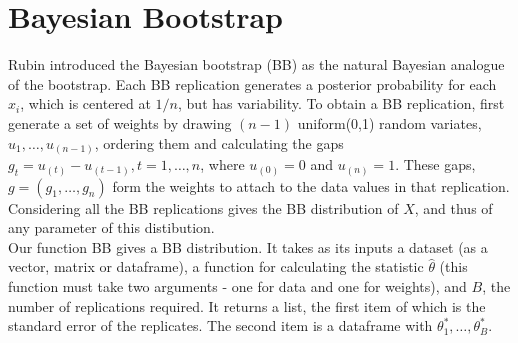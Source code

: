 \documentclass{article}\usepackage[]{graphicx}\usepackage[]{color}
\begin{document}
\section{Bayesian Bootstrap}
Rubin introduced the Bayesian bootstrap (BB) as the natural Bayesian analogue of the bootstrap. Each BB replication generates a posterior probability for each $x_i$, which is centered at $1/n$, but has variability. To obtain a BB replication, first generate a set of weights by drawing $(n-1)$ uniform(0,1) random variates, $u_1, \ldots, u_(n-1)$, ordering them and calculating the gaps $g_t = u_{(t)} - u_{(t-1)}, t=1,\ldots,n$, where $u_{(0)}=0$ and $u_{(n)}=1$. These gaps, $g = (g_1,\ldots,g_n)$ form the weights to attach to the data values in that replication. Considering all the BB replications gives the BB distribution of $X$, and thus of any parameter of this distibution.\\

Our function BB gives a BB distribution. It takes as its inputs a dataset (as a vector, matrix or dataframe), a function for calculating the statistic $\hat{\theta}$ (this function must take two arguments - one for data and one for weights), and $B$, the number of replications required. It returns a list, the first item of which is the standard error of the replicates. The second item is a dataframe with $\theta_1^*,\ldots,\theta_B^*$.
\end{document}
